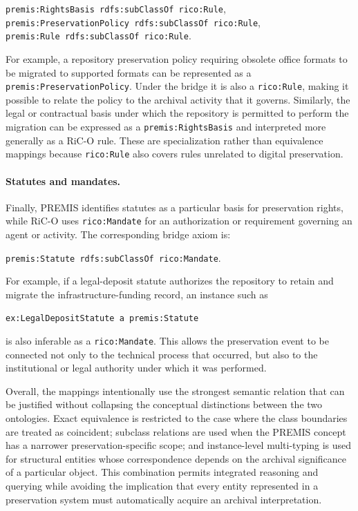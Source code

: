 \documentclass[runningheads]{llncs}
\begin{document}
\begin{center}
	\texttt{premis:RightsBasis rdfs:subClassOf rico:Rule},\\
	\texttt{premis:PreservationPolicy rdfs:subClassOf rico:Rule},\\
	\texttt{premis:Rule rdfs:subClassOf rico:Rule}.
\end{center}

For example, a repository preservation policy requiring obsolete office
formats to be migrated to supported formats can be represented as a
\texttt{premis:PreservationPolicy}. Under the bridge it is also a
\texttt{rico:Rule}, making it possible to relate the policy to the archival
activity that it governs. Similarly, the legal or contractual basis under
which the repository is permitted to perform the migration can be expressed
as a \texttt{premis:RightsBasis} and interpreted more generally as a RiC-O
rule. These are specialization rather than equivalence mappings because
\texttt{rico:Rule} also covers rules unrelated to digital preservation.

\paragraph{Statutes and mandates.}
Finally, PREMIS identifies statutes as a particular basis for preservation
rights, while RiC-O uses \texttt{rico:Mandate} for an authorization or
requirement governing an agent or activity. The corresponding bridge axiom is:

\begin{center}
	\texttt{premis:Statute rdfs:subClassOf rico:Mandate}.
\end{center}

For example, if a legal-deposit statute authorizes the repository to retain
and migrate the infrastructure-funding record, an instance such as

\begin{center}
	\texttt{ex:LegalDepositStatute a premis:Statute}
\end{center}

is also inferable as a \texttt{rico:Mandate}. This allows the preservation
event to be connected not only to the technical process that occurred, but
also to the institutional or legal authority under which it was performed.

Overall, the mappings intentionally use the strongest semantic relation that
can be justified without collapsing the conceptual distinctions between the
two ontologies. Exact equivalence is restricted to the case where the class
boundaries are treated as coincident; subclass relations are used when the
PREMIS concept has a narrower preservation-specific scope; and
instance-level multi-typing is used for structural entities whose
correspondence depends on the archival significance of a particular object.
This combination permits integrated reasoning and querying while avoiding
the implication that every entity represented in a preservation system must
automatically acquire an archival interpretation.
\end{document}
